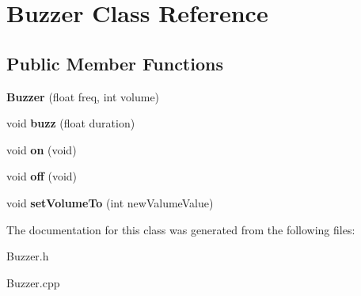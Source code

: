 \hypertarget{class_buzzer}{
\section{Buzzer Class Reference}
\label{class_buzzer}
}
\subsection*{Public Member Functions}
\begin{DoxyCompactItemize}
\item 
\hypertarget{class_buzzer_a3d3ee23e33fb2f9b47aacae4f118bb12}{
{\bfseries Buzzer} (float freq, int volume)}
\label{class_buzzer_a3d3ee23e33fb2f9b47aacae4f118bb12}

\item 
\hypertarget{class_buzzer_ac9baccffeb0d92e5827c659eec7f44e2}{
void {\bfseries buzz} (float duration)}
\label{class_buzzer_ac9baccffeb0d92e5827c659eec7f44e2}

\item 
\hypertarget{class_buzzer_a65faa33dc2c30e4a7d04a7a9f530c35f}{
void {\bfseries on} (void)}
\label{class_buzzer_a65faa33dc2c30e4a7d04a7a9f530c35f}

\item 
\hypertarget{class_buzzer_a75554c28f2dd07873f40ea3b0f266617}{
void {\bfseries off} (void)}
\label{class_buzzer_a75554c28f2dd07873f40ea3b0f266617}

\item 
\hypertarget{class_buzzer_a2e35cac53021a1efb0f92e7e8a6b0b4f}{
void {\bfseries setVolumeTo} (int newValumeValue)}
\label{class_buzzer_a2e35cac53021a1efb0f92e7e8a6b0b4f}

\end{DoxyCompactItemize}


The documentation for this class was generated from the following files:\begin{DoxyCompactItemize}
\item 
Buzzer.h\item 
Buzzer.cpp\end{DoxyCompactItemize}
